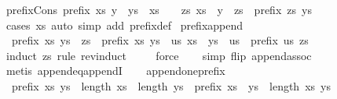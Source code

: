 \begin{isabellebody}
\endisatagproof
{\isafoldproof}%
%
\isadelimproof
\isanewline
%
\endisadelimproof
\isanewline
{}\isamarkupfalse%
\ prefix{\isacharunderscore}Cons{\isacharcolon}\ {\isachardoublequoteopen}prefix\ xs\ {\isacharparenleft}y\ {\isacharhash}\ ys{\isacharparenright}\ {\isacharequal}\ {\isacharparenleft}xs\ {\isacharequal}\ {\isacharbrackleft}{\isacharbrackright}\ {\isasymor}\ {\isacharparenleft}{\isasymexists}zs{\isachardot}\ xs\ {\isacharequal}\ y\ {\isacharhash}\ zs\ {\isasymand}\ prefix\ zs\ ys{\isacharparenright}{\isacharparenright}{\isachardoublequoteclose}\isanewline
%
\isadelimproof
\ \ %
\endisadelimproof
%
\isatagproof
{}\isamarkupfalse%
\ {\isacharparenleft}cases\ xs{\isacharparenright}\ {\isacharparenleft}auto\ simp\ add{\isacharcolon}\ prefix{\isacharunderscore}def{\isacharparenright}%
\endisatagproof
{\isafoldproof}%
%
\isadelimproof
\isanewline
%
\endisadelimproof
\isanewline
{}\isamarkupfalse%
\ prefix{\isacharunderscore}append{\isacharcolon}\isanewline
\ \ {\isachardoublequoteopen}prefix\ xs\ {\isacharparenleft}ys\ {\isacharat}\ zs{\isacharparenright}\ {\isacharequal}\ {\isacharparenleft}prefix\ xs\ ys\ {\isasymor}\ {\isacharparenleft}{\isasymexists}us{\isachardot}\ xs\ {\isacharequal}\ ys\ {\isacharat}\ us\ {\isasymand}\ prefix\ us\ zs{\isacharparenright}{\isacharparenright}{\isachardoublequoteclose}\isanewline
%
\isadelimproof
\ \ %
\endisadelimproof
%
\isatagproof
{}\isamarkupfalse%
\ {\isacharparenleft}induct\ zs\ rule{\isacharcolon}\ rev{\isacharunderscore}induct{\isacharparenright}\isanewline
\ \ \ \isamarkupfalse%
\ force\isanewline
\ \ \isamarkupfalse%
\ {\isacharparenleft}simp\ flip{\isacharcolon}\ append{\isacharunderscore}assoc{\isacharparenright}\isanewline
\ \ \isamarkupfalse%
\ {\isacharparenleft}metis\ append{\isacharunderscore}eq{\isacharunderscore}appendI{\isacharparenright}\isanewline
\ \ \isamarkupfalse%
%
\endisatagproof
{\isafoldproof}%
%
\isadelimproof
\isanewline
%
\endisadelimproof
\isanewline
{}\isamarkupfalse%
\ append{\isacharunderscore}one{\isacharunderscore}prefix{\isacharcolon}\isanewline
\ \ {\isachardoublequoteopen}prefix\ xs\ ys\ {\isasymLongrightarrow}\ length\ xs\ {\isacharless}\ length\ ys\ {\isasymLongrightarrow}\ prefix\ {\isacharparenleft}xs\ {\isacharat}\ {\isacharbrackleft}ys\ {\isacharbang}\ length\ xs{\isacharbrackright}{\isacharparenright}\ ys{\isachardoublequoteclose}\isanewline
%
\isadelimproof
\ \ %
\endisadelimproof
%
\isatagproof
{}\isamarkupfalse%

\end{isabellebody}
